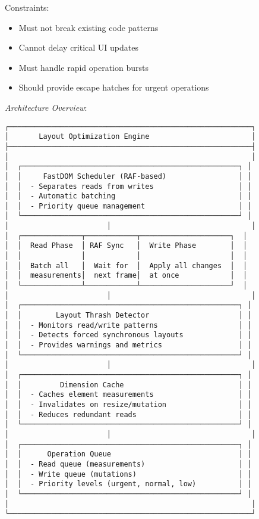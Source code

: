 \documentclass[11pt]{article}
\begin{document}
Constraints:

\begin{itemize}
\item Must not break existing code patterns
\item Cannot delay critical UI updates
\item Must handle rapid operation bursts
\item Should provide escape hatches for urgent operations
\end{itemize}

\emph{Architecture Overview}:

\begin{verbatim}
┌─────────────────────────────────────────────────────────┐
│       Layout Optimization Engine                        │
├─────────────────────────────────────────────────────────┤
│                                                         │
│  ┌───────────────────────────────────────────────────┐ │
│  │     FastDOM Scheduler (RAF-based)                 │ │
│  │  - Separates reads from writes                    │ │
│  │  - Automatic batching                             │ │
│  │  - Priority queue management                      │ │
│  └───────────────────────────────────────────────────┘ │
│                       │                                 │
│  ┌──────────────┬────────────┬─────────────────────┐  │
│  │  Read Phase  │ RAF Sync   │  Write Phase        │  │
│  │              │            │                     │  │
│  │  Batch all   │  Wait for  │  Apply all changes  │  │
│  │  measurements│  next frame│  at once            │  │
│  └──────────────┴────────────┴─────────────────────┘  │
│                       │                                 │
│  ┌───────────────────────────────────────────────────┐ │
│  │        Layout Thrash Detector                     │ │
│  │  - Monitors read/write patterns                   │ │
│  │  - Detects forced synchronous layouts             │ │
│  │  - Provides warnings and metrics                  │ │
│  └───────────────────────────────────────────────────┘ │
│                       │                                 │
│  ┌───────────────────────────────────────────────────┐ │
│  │         Dimension Cache                           │ │
│  │  - Caches element measurements                    │ │
│  │  - Invalidates on resize/mutation                 │ │
│  │  - Reduces redundant reads                        │ │
│  └───────────────────────────────────────────────────┘ │
│                       │                                 │
│  ┌───────────────────────────────────────────────────┐ │
│  │      Operation Queue                              │ │
│  │  - Read queue (measurements)                      │ │
│  │  - Write queue (mutations)                        │ │
│  │  - Priority levels (urgent, normal, low)          │ │
│  └───────────────────────────────────────────────────┘ │
│                                                         │
└─────────────────────────────────────────────────────────┘
\end{verbatim}
\end{document}
